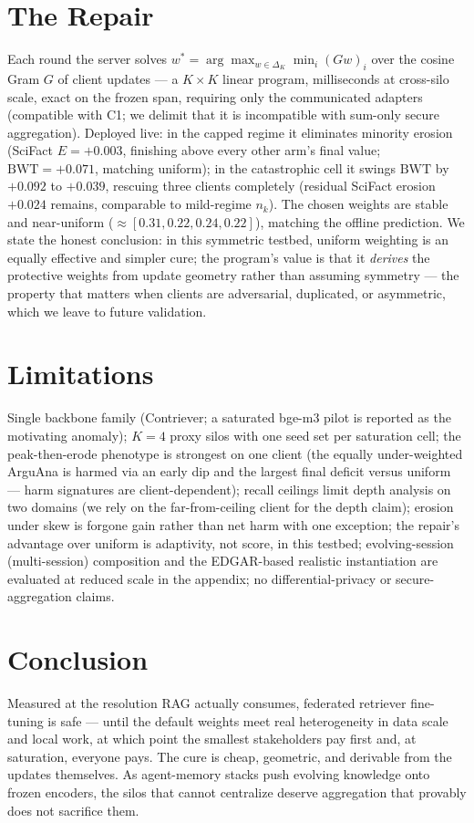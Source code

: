 \documentclass[sigconf,anonymous,review]{acmart}
\newcommand{\BWT}{\mathrm{BWT}}
\begin{document}
\section{The Repair}\label{sec:repair}
Each round the server solves $w^\ast = \arg\max_{w \in \Delta_K} \min_i (Gw)_i$ over the cosine Gram $G$ of client updates --- a $K{\times}K$ linear program, milliseconds at cross-silo scale, exact on the frozen span, requiring only the communicated adapters (compatible with C1; we delimit that it is incompatible with sum-only secure aggregation). Deployed live: in the capped regime it eliminates minority erosion (SciFact $E{=}+0.003$, finishing above every other arm's final value; $\BWT{=}+0.071$, matching uniform); in the catastrophic cell it swings $\BWT$ by $+0.092$ to $+0.039$, rescuing three clients completely (residual SciFact erosion $+0.024$ remains, comparable to mild-regime $n_k$). The chosen weights are stable and near-uniform ($\approx[0.31,0.22,0.24,0.22]$), matching the offline prediction. We state the honest conclusion: in this symmetric testbed, uniform weighting is an equally effective and simpler cure; the program's value is that it \emph{derives} the protective weights from update geometry rather than assuming symmetry --- the property that matters when clients are adversarial, duplicated, or asymmetric, which we leave to future validation.

\section{Limitations}\label{sec:limitations}
Single backbone family (Contriever; a saturated bge-m3 pilot is reported as the motivating anomaly); $K{=}4$ proxy silos with one seed set per saturation cell; the peak-then-erode phenotype is strongest on one client (the equally under-weighted ArguAna is harmed via an early dip and the largest final deficit versus uniform --- harm signatures are client-dependent); recall ceilings limit depth analysis on two domains (we rely on the far-from-ceiling client for the depth claim); erosion under skew is forgone gain rather than net harm with one exception; the repair's advantage over uniform is adaptivity, not score, in this testbed; evolving-session (multi-session) composition and the EDGAR-based realistic instantiation are evaluated at reduced scale in the appendix; no differential-privacy or secure-aggregation claims.

\section{Conclusion}
Measured at the resolution RAG actually consumes, federated retriever fine-tuning is safe --- until the default weights meet real heterogeneity in data scale and local work, at which point the smallest stakeholders pay first and, at saturation, everyone pays. The cure is cheap, geometric, and derivable from the updates themselves. As agent-memory stacks push evolving knowledge onto frozen encoders, the silos that cannot centralize deserve aggregation that provably does not sacrifice them.

\nocite{*}%


\end{document}
